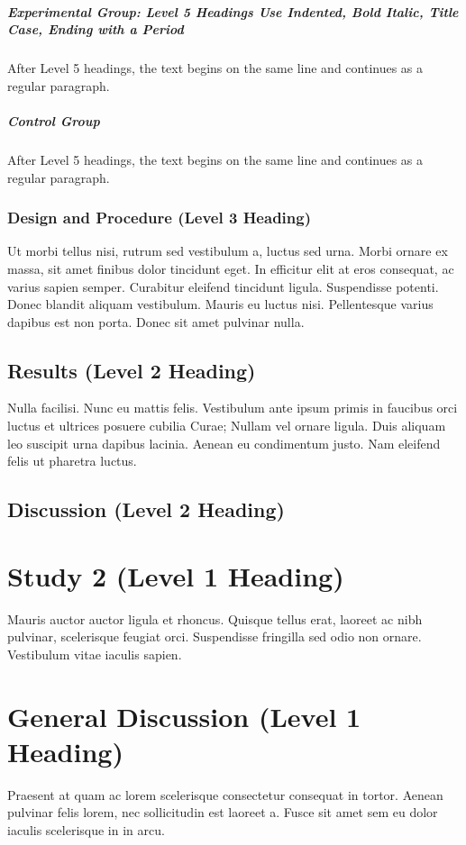 \documentclass{ldr-article}
\begin{document}
\subparagraph{Experimental Group: Level 5 Headings Use Indented, Bold Italic, Title Case, Ending with a Period}
After Level 5 headings, the text begins on the same line and continues as a regular paragraph.

\subparagraph{Control Group}
After Level 5 headings, the text begins on the same line and continues as a regular paragraph.

\subsubsection{Design and Procedure (Level 3 Heading)}
Ut morbi tellus nisi, rutrum sed vestibulum a, luctus sed urna. Morbi ornare ex massa, sit amet finibus dolor tincidunt eget. In efficitur elit at eros consequat, ac varius sapien semper. Curabitur eleifend tincidunt ligula. Suspendisse potenti. Donec blandit aliquam vestibulum. Mauris eu luctus nisi. Pellentesque varius dapibus est non porta. Donec sit amet pulvinar nulla.

\subsection{Results (Level 2 Heading)}

Nulla facilisi. Nunc eu mattis felis. Vestibulum ante ipsum primis in faucibus orci luctus et ultrices posuere cubilia Curae; Nullam vel ornare ligula. Duis aliquam leo suscipit urna dapibus lacinia. Aenean eu condimentum justo. Nam eleifend felis ut pharetra luctus. 


\subsection{Discussion (Level 2 Heading)}

\section{Study 2 (Level 1 Heading)}

Mauris auctor auctor ligula et rhoncus. Quisque tellus erat, laoreet ac nibh pulvinar, scelerisque feugiat orci. Suspendisse fringilla sed odio non ornare. Vestibulum vitae iaculis sapien. 

\section{General Discussion (Level 1 Heading)}

Praesent at quam ac lorem scelerisque consectetur consequat in tortor. Aenean pulvinar felis lorem, nec sollicitudin est laoreet a. Fusce sit amet sem eu dolor iaculis scelerisque in in arcu.
\end{document}

